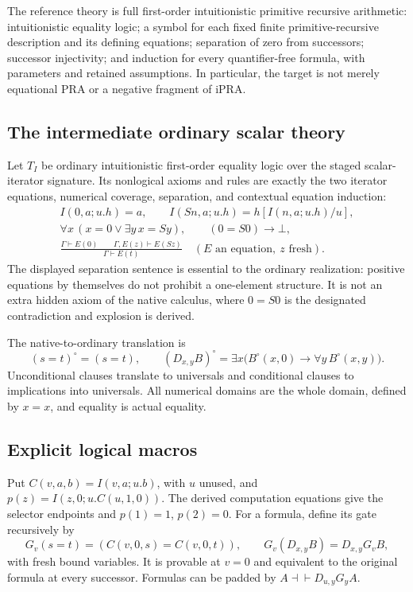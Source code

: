 \documentclass[11pt,letterpaper]{article}
\theoremstyle{definition}\newtheorem{definition}[theorem]{Definition}
\theoremstyle{remark}\newtheorem{remark}[theorem]{Remark}
\begin{document}
The reference theory is full first-order intuitionistic primitive recursive
arithmetic: intuitionistic equality logic; a symbol for each fixed finite
primitive-recursive description and its defining equations; separation of
zero from successors; successor injectivity; and induction for every
quantifier-free formula, with parameters and retained assumptions.
In particular, the target is not merely equational PRA or a negative
fragment of iPRA.

\subsection{The intermediate ordinary scalar theory}

Let $T_I$ be ordinary intuitionistic first-order equality logic over the
staged scalar-iterator signature. Its nonlogical axioms and rules are exactly
the two iterator equations, numerical coverage, separation, and contextual
equation induction:
\begin{gather*}
 I(0,a;u.h)=a,\qquad I(Sn,a;u.h)=h[I(n,a;u.h)/u],\\
 \forall x\,(x=0\vee\exists y\,x=Sy),\qquad (0=S0)\to\bot,\\
 \frac{\Gamma\vdash E(0)\qquad\Gamma,E(z)\vdash E(Sz)}
      {\Gamma\vdash E(t)}\quad(E\text{ an equation},\ z\text{ fresh}).
\end{gather*}
The displayed separation sentence is essential to the ordinary realization:
positive equations by themselves do not prohibit a one-element structure.
It is not an extra hidden axiom of the native calculus, where $0=S0$ is
the designated contradiction and explosion is derived.

The native-to-ordinary translation is
\[
 (s=t)^\circ=(s=t),\qquad
 (D_{x,y}B)^\circ=\exists x\bigl(B^\circ(x,0)\to\forall y\,B^\circ(x,y)\bigr).
\]
Unconditional clauses translate to universals and conditional clauses to
implications into universals. All numerical domains are the whole domain,
defined by $x=x$, and equality is actual equality.

\subsection{Explicit logical macros}

Put $C(v,a,b)=I(v,a;u.b)$, with $u$ unused, and
$p(z)=I(z,0;u.C(u,1,0))$. The derived computation equations give the
selector endpoints and $p(1)=1$, $p(2)=0$.
For a formula, define its gate recursively by
\[
 G_v(s=t)=(C(v,0,s)=C(v,0,t)),\qquad
 G_v(D_{x,y}B)=D_{x,y}G_vB,
\]
with fresh bound variables. It is provable at $v=0$ and equivalent to the
original formula at every successor. Formulas can be padded by
$A\dashv\vdash D_{u,y}G_yA$.
\end{document}
